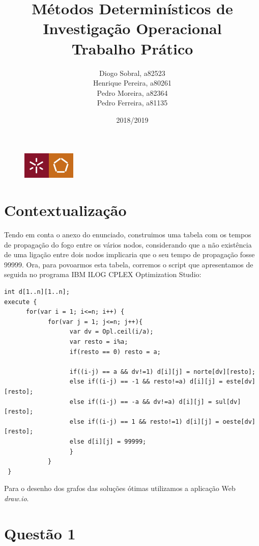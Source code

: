 \documentclass[11pt]{article} %
\title{Métodos Determinísticos de Investigação Operacional \\ \large Trabalho Prático}
\author{Diogo Sobral, a82523 \\ Henrique Pereira, a80261 \\ Pedro Moreira, a82364 \\ Pedro Ferreira, a81135}
\date{2018/2019}
\begin{document}
\maketitle

\begin{figure}[!b]
    \centering
    \includegraphics[width=1in]{um_eeng.jpg}
\end{figure}

\newpage

\section*{Contextualização}
Tendo em conta o anexo do enunciado, construimos uma tabela com os tempos de propagação do fogo entre os vários nodos, considerando que a não existência de uma ligação entre dois nodos implicaria que o seu tempo de propagação fosse 99999. Ora, para povoarmos esta tabela, corremos o script que apresentamos de seguida no programa IBM ILOG CPLEX Optimization Studio:
\begin{verbatim}
int d[1..n][1..n];
execute {
      for(var i = 1; i<=n; i++) {
            for(var j = 1; j<=n; j++){
                  var dv = Opl.ceil(i/a);
                  var resto = i%a;
                  if(resto == 0) resto = a;
	 		
                  if((i-j) == a && dv!=1) d[i][j] = norte[dv][resto];
                  else if((i-j) == -1 && resto!=a) d[i][j] = este[dv][resto];
                  else if((i-j) == -a && dv!=a) d[i][j] = sul[dv][resto];
                  else if((i-j) == 1 && resto!=1) d[i][j] = oeste[dv][resto];
                  else d[i][j] = 99999; 	
                  }	
            }	  
 }
\end{verbatim}

Para o desenho dos grafos das soluções ótimas utilizamos a aplicação Web \textit{draw.io}.

\newpage

\section*{Questão 1}
\end{document}
